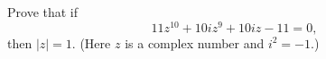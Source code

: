 Prove that if
\[
11z^{10}+10iz^9+10iz-11=0,
\]
then $|z|=1.$ (Here $z$ is a complex number and $i^2=-1$.)
